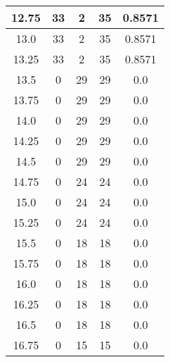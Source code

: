 \documentclass[letterpaper, 12pt]{article}
\begin{document}
\begin{longtable}{|c|c|c|c|c|}
\hline
12.75 & 33 & 2 & 35 & 0.8571 \\
\hline
13.0 & 33 & 2 & 35 & 0.8571 \\
\hline
13.25 & 33 & 2 & 35 & 0.8571 \\
\hline
13.5 & 0 & 29 & 29 & 0.0 \\
\hline
13.75 & 0 & 29 & 29 & 0.0 \\
\hline
14.0 & 0 & 29 & 29 & 0.0 \\
\hline
14.25 & 0 & 29 & 29 & 0.0 \\
\hline
14.5 & 0 & 29 & 29 & 0.0 \\
\hline
14.75 & 0 & 24 & 24 & 0.0 \\
\hline
15.0 & 0 & 24 & 24 & 0.0 \\
\hline
15.25 & 0 & 24 & 24 & 0.0 \\
\hline
15.5 & 0 & 18 & 18 & 0.0 \\
\hline
15.75 & 0 & 18 & 18 & 0.0 \\
\hline
16.0 & 0 & 18 & 18 & 0.0 \\
\hline
16.25 & 0 & 18 & 18 & 0.0 \\
\hline
16.5 & 0 & 18 & 18 & 0.0 \\
\hline
16.75 & 0 & 15 & 15 & 0.0 \\
\hline
\end{longtable}
\end{document}
